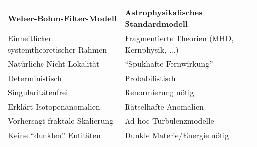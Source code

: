 \begin{tabular}{p{}p{}}
\hline
\textbf{Weber-Bohm-Filter-Modell} & \textbf{Astrophysikalisches Standardmodell} \\
\hline
Einheitlicher systemtheoretischer Rahmen & Fragmentierte Theorien (MHD, Kernphysik, ...) \\
\hline
Natürliche Nicht-Lokalität & \enquote{Spukhafte Fernwirkung} \\
\hline
Deterministisch & Probabilistisch \\
\hline
Singularitätenfrei & Renormierung nötig \\
\hline
Erklärt Isotopenanomalien & Rätselhafte Anomalien \\
\hline
Vorhersagt fraktale Skalierung & Ad-hoc Turbulenzmodelle \\
\hline
Keine \enquote{dunklen} Entitäten & Dunkle Materie/Energie nötig \\
\hline
\end{tabular}
